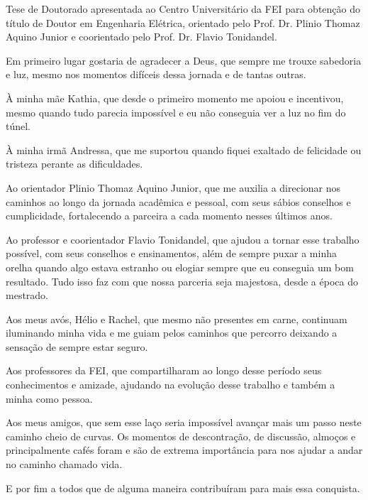 \maketitle{}

\begin{folhaderosto}
Tese de Doutorado apresentada ao Centro Universitário da FEI para obtenção do título de Doutor em Engenharia Elétrica, orientado pelo Prof. Dr. Plinio Thomaz Aquino Junior e coorientado pelo Prof. Dr. Flavio Tonidandel.
\end{folhaderosto}




\begin{agradecimentos}
Em primeiro lugar gostaria de agradecer a Deus, que sempre me trouxe sabedoria e luz, mesmo nos momentos difíceis dessa jornada e de tantas outras.

À minha mãe Kathia, que desde o primeiro momento me apoiou e incentivou, mesmo quando tudo parecia impossível e eu não conseguia ver a luz no fim do túnel.

À minha irmã Andressa, que me suportou quando fiquei exaltado de felicidade ou tristeza perante as dificuldades.

Ao orientador Plinio Thomaz Aquino Junior, que me auxilia a direcionar nos caminhos ao longo da jornada acadêmica e pessoal, com seus sábios conselhos e cumplicidade, fortalecendo a parceira a cada momento nesses últimos anos.

Ao professor e coorientador Flavio Tonidandel, que ajudou a tornar esse trabalho possível, com seus conselhos e ensinamentos, além de sempre puxar a minha orelha quando algo estava estranho ou elogiar sempre que eu conseguia um bom resultado. Tudo isso faz com que nossa parceria seja majestosa, desde a época do mestrado.

Aos meus avós, Hélio e Rachel, que mesmo não presentes em carne, continuam iluminando minha vida e me guiam pelos caminhos que percorro deixando a sensação de sempre estar seguro.

Aos professores da FEI, que compartilharam ao longo desse período seus conhecimentos e amizade, ajudando na evolução desse trabalho e também a minha como pessoa.

Aos meus amigos, que sem esse laço seria impossível avançar mais um passo neste caminho cheio de curvas. Os momentos de descontração, de discussão, almoços e principalmente cafés foram e são de extrema importância para nos ajudar a andar no caminho chamado vida.

E por fim a todos que de alguma maneira contribuíram para mais essa conquista.

\end{agradecimentos}

